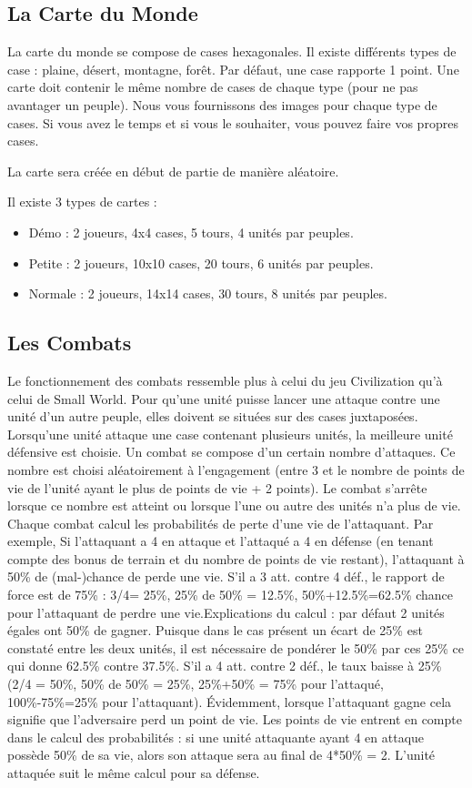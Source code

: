 	\subsection{La Carte du Monde}
	La carte du monde se compose de cases hexagonales. Il existe différents types de case : plaine,	désert, montagne, forêt. Par défaut, une case rapporte 1 point. Une carte doit contenir le même nombre de cases de chaque type (pour ne pas avantager un peuple). Nous vous fournissons des	images pour chaque type de cases. Si vous avez le temps et si vous le souhaiter, vous pouvez faire vos propres cases.

	La carte sera créée en début de partie de manière aléatoire.

	Il existe 3 types de cartes :
	\begin{itemize}
		\item Démo : 2 joueurs, 4x4 cases, 5 tours, 4 unités par peuples.
		\item Petite : 2 joueurs, 10x10 cases, 20 tours, 6 unités par peuples.
		\item Normale : 2 joueurs, 14x14 cases, 30 tours, 8 unités par peuples.
	\end{itemize}

	\subsection{Les Combats}
	
	Le fonctionnement des combats ressemble plus à celui du jeu Civilization qu’à celui de Small World.
	Pour qu’une unité puisse lancer une attaque contre une unité d’un autre peuple, elles doivent se situées sur des cases juxtaposées. Lorsqu’une unité attaque une case contenant plusieurs unités, la meilleure unité défensive est choisie. Un combat se compose d’un certain nombre d’attaques. Ce	nombre est choisi aléatoirement à l’engagement (entre 3 et le nombre de points de vie de l’unité ayant le plus de points de vie + 2 points). Le combat s’arrête lorsque ce nombre est atteint ou lorsque l’une ou autre des unités n’a plus de vie. Chaque combat calcul les probabilités de perte d’une vie de l’attaquant. Par exemple, Si l’attaquant a 4 en attaque et l’attaqué a 4 en défense	(en tenant compte des bonus de terrain et du nombre de points de vie restant), l’attaquant à 50\% de (mal-)chance de perde une vie. S’il a 3 att. contre 4 déf., le rapport de force est de 75\% : 3/4= 25\%, 25\% de 50\% = 12.5\%, 50\%+12.5\%=62.5\% chance pour l’attaquant de perdre une vie.Explications du calcul : par défaut 2 unités égales ont 50\% de gagner. Puisque dans le cas présent	un écart de 25\% est constaté entre les deux unités, il est nécessaire de pondérer le 50\% par ces 25\% ce qui donne 62.5\% contre 37.5\%. S’il a 4 att. contre 2 déf., le taux baisse à 25\% (2/4 = 50\%, 50\%	de 50\% = 25\%, 25\%+50\% = 75\% pour l’attaqué, 100\%-75\%=25\% pour l’attaquant). Évidemment,	lorsque l’attaquant gagne cela signifie que l’adversaire perd un point de vie.	Les points de vie entrent en compte dans le calcul des probabilités : si une unité attaquante ayant	4 en attaque possède 50\% de sa vie, alors son attaque sera au final de 4*50\% = 2. L’unité attaquée suit le même calcul pour sa défense.

